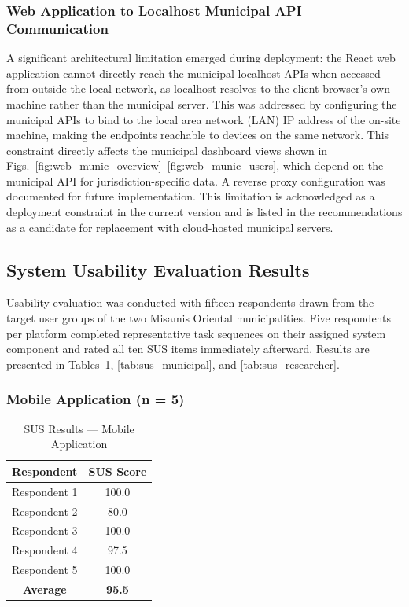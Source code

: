 \documentclass{icsthesis}
\begin{document}
\begin{mainmatter}
\subsubsection{Web Application to Localhost Municipal API Communication}

A significant architectural limitation emerged during deployment: the React web
application cannot directly reach the municipal localhost APIs when accessed from outside
the local network, as localhost resolves to the client browser's own machine rather than
the municipal server. This was addressed by configuring the municipal APIs to bind to the
local area network (LAN) IP address of the on-site machine, making the endpoints
reachable to devices on the same network. This constraint directly affects the municipal
dashboard views shown in
Figs.~\ref{fig:web_munic_overview}--\ref{fig:web_munic_users}, which depend on
the municipal API for jurisdiction-specific data. A reverse proxy configuration was
documented for future implementation. This limitation is acknowledged as a deployment
constraint in the current version and is listed in the recommendations as a candidate for
replacement with cloud-hosted municipal servers.

\subsection{System Usability Evaluation Results}

Usability evaluation was conducted with fifteen respondents drawn from the target user
groups of the two Misamis Oriental municipalities. Five respondents per platform completed
representative task sequences on their assigned system component and rated all ten SUS
items immediately afterward. Results are
presented in Tables~\ref{tab:sus_mobile}, \ref{tab:sus_municipal}, and
\ref{tab:sus_researcher}.

\subsubsection{Mobile Application (n = 5)}

\begin{table}[h]
\centering
\caption{SUS Results --- Mobile Application}
\label{tab:sus_mobile}
\begin{tabular}{@{}cc@{}}
\hline
\hline
\toprule
\textbf{Respondent} & \textbf{SUS Score} \\
\midrule
\hline
Respondent 1 & 100.0 \\
Respondent 2 & 80.0 \\
Respondent 3 & 100.0 \\
Respondent 4 & 97.5 \\
Respondent 5 & 100.0 \\ \hline
\midrule
\textbf{Average} & \textbf{95.5} \\
\bottomrule
\hline
\hline
\end{tabular}
\end{table}


\end{mainmatter}
\end{document}
